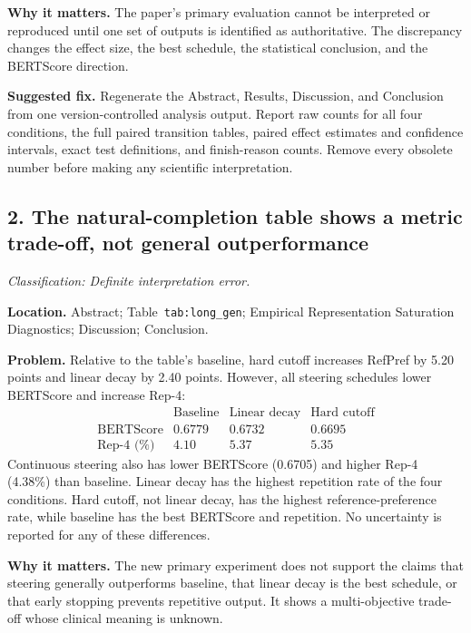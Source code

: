 \documentclass[11pt]{article}
\newcommand{\findinglabel}[1]{\textbf{#1}}
\newcommand{\classification}[1]{\textit{Classification: #1.}}
\begin{document}
\findinglabel{Why it matters.} The paper's primary evaluation cannot be interpreted or reproduced until one set of outputs is identified as authoritative.  The discrepancy changes the effect size, the best schedule, the statistical conclusion, and the BERTScore direction.

\findinglabel{Suggested fix.} Regenerate the Abstract, Results, Discussion, and Conclusion from one version-controlled analysis output.  Report raw counts for all four conditions, the full paired transition tables, paired effect estimates and confidence intervals, exact test definitions, and finish-reason counts.  Remove every obsolete number before making any scientific interpretation.

\subsection*{2. The natural-completion table shows a metric trade-off, not general outperformance}

\classification{Definite interpretation error}

\findinglabel{Location.} Abstract; Table~\texttt{tab:long\_gen}; Empirical Representation Saturation Diagnostics; Discussion; Conclusion.

\findinglabel{Problem.} Relative to the table's baseline, hard cutoff increases RefPref by 5.20 points and linear decay by 2.40 points.  However, all steering schedules lower BERTScore and increase Rep-4:
\[
\begin{array}{c|ccc}
& \text{Baseline} & \text{Linear decay} & \text{Hard cutoff} \\
\hline
\text{BERTScore} & 0.6779 & 0.6732 & 0.6695 \\
\text{Rep-4 (\%)} & 4.10 & 5.37 & 5.35
\end{array}
\]
Continuous steering also has lower BERTScore (0.6705) and higher Rep-4 (4.38\%) than baseline.  Linear decay has the highest repetition rate of the four conditions.  Hard cutoff, not linear decay, has the highest reference-preference rate, while baseline has the best BERTScore and repetition.  No uncertainty is reported for any of these differences.

\findinglabel{Why it matters.} The new primary experiment does not support the claims that steering generally outperforms baseline, that linear decay is the best schedule, or that early stopping prevents repetitive output.  It shows a multi-objective trade-off whose clinical meaning is unknown.
\end{document}
